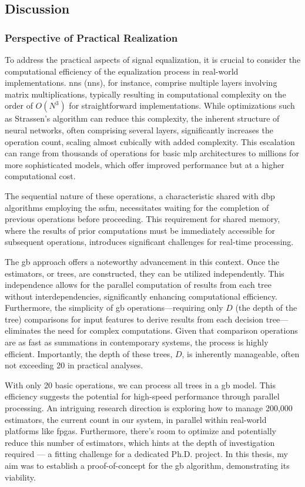 \subsection{Discussion}
\subsubsection{Perspective of Practical Realization}

To address the practical aspects of signal equalization, it is crucial to consider the computational efficiency of the equalization process in real-world implementations. \acrlong{nn}s (\acrshort{nn}s), for instance, comprise multiple layers involving matrix multiplications, typically resulting in computational complexity on the order of $O(N^3)$ for straightforward implementations. While optimizations such as Strassen's algorithm can reduce this complexity, the inherent structure of neural networks, often comprising several layers, significantly increases the operation count, scaling almost cubically with added complexity. This escalation can range from thousands of operations for basic \acrfull{mlp} architectures to millions for more sophisticated models, which offer improved performance but at a higher computational cost.

The sequential nature of these operations, a characteristic shared with \acrfull{dbp} algorithms employing the \acrfull{ssfm}, necessitates waiting for the completion of previous operations before proceeding. This requirement for shared memory, where the results of prior computations must be immediately accessible for subsequent operations, introduces significant challenges for real-time processing.

The \acrlong{gb} approach offers a noteworthy advancement in this context. Once the estimators, or trees, are constructed, they can be utilized independently. This independence allows for the parallel computation of results from each tree without interdependencies, significantly enhancing computational efficiency. Furthermore, the simplicity of \acrshort{gb} operations—requiring only $D$ (the depth of the tree) comparisons for input features to derive results from each decision tree—eliminates the need for complex computations. Given that comparison operations are as fast as summations in contemporary systems, the process is highly efficient. Importantly, the depth of these trees, $D$, is inherently manageable, often not exceeding 20 in practical analyses.

With only 20 basic operations, we can process all trees in a \acrlong{gb} model. This efficiency suggests the potential for high-speed performance through parallel processing. An intriguing research direction is exploring how to manage 200,000 estimators, the current count in our system, in parallel within real-world platforms like \acrshort{fpga}s. Furthermore, there's room to optimize and potentially reduce this number of estimators, which hints at the depth of investigation required --- a fitting challenge for a dedicated Ph.D. project. In this thesis, my aim was to establish a proof-of-concept for the \acrshort{gb} algorithm, demonstrating its viability.

